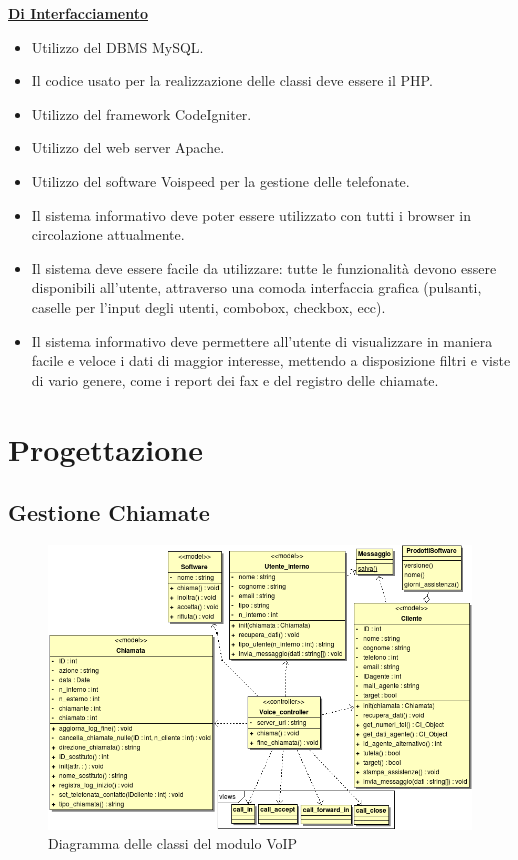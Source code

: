 \underline{\textbf{Di Interfacciamento}}
\begin{itemize}
	  \item Utilizzo del DBMS MySQL.
	  \item Il codice usato per la realizzazione delle classi deve essere il PHP.			
	  \item Utilizzo del framework CodeIgniter.
	  \item Utilizzo del web server Apache.
	  \item Utilizzo del software Voispeed per la gestione delle telefonate.
	  \item Il sistema informativo deve poter essere utilizzato con tutti i browser in circolazione attualmente.
	  \item Il sistema deve essere facile da utilizzare: tutte le funzionalit\`a devono essere disponibili all’utente, attraverso una comoda interfaccia grafica (pulsanti, caselle per l’input degli utenti, combobox, checkbox, ecc).
	  \item Il sistema informativo deve permettere all’utente di visualizzare in maniera facile e veloce i dati di maggior interesse, mettendo a disposizione filtri e viste di vario genere, come i report dei fax e del registro delle chiamate.
\end{itemize}

\newpage
\section{Progettazione}
\subsection{Gestione Chiamate}
\begin{figure}[!ht]
\centering
  \includegraphics[scale=0.7]{./images/VoIPMVC.png}
\caption{Diagramma delle classi del modulo VoIP}
\label{voip}
\end{figure}

